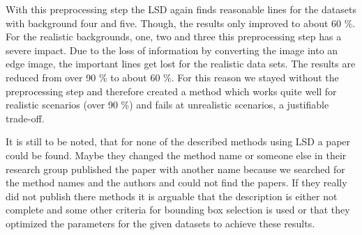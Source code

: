 \documentclass[english, paper=a4]{scrartcl}
\begin{document}
With this preprocessing step the LSD again finds reasonable lines for the datasets
with background four and five. Though, the results only improved to about 60 \%.
For the realistic backgrounds, one, two and three this preprocessing step has a severe impact. Due to the loss of information by converting the image into an edge image,
the important lines get lost for the realistic data sets.
The results are reduced from over 90 \% to about 60 \%. 
For this reason we stayed without the preprocessing step and 
therefore created a method which works quite well for realistic scenarios
(over 90 \%) and fails at unrealistic scenarios, a justifiable trade-off.

It is still to be noted, that for none of the described methods using LSD
a paper could be found. Maybe they changed the method name or someone else
in their research group published the paper with another name
because we searched for the method names and the authors and could not find the papers.
If they really did not publish there methods it is arguable that 
the description is either not complete and some other
criteria for bounding box selection is used or that they optimized
the parameters for the given datasets to achieve these results.

\newpage


\end{document}
